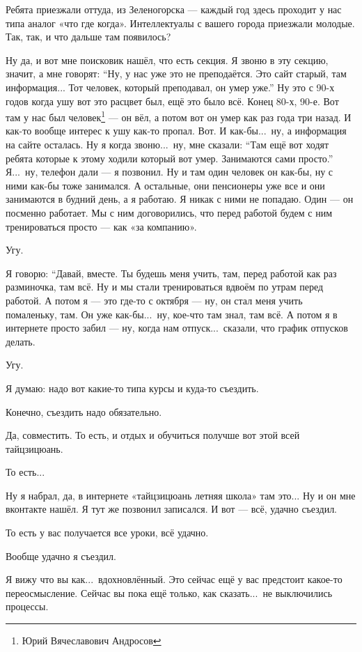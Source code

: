 \A
Ребята приезжали оттуда, из Зеленогорска --- каждый год здесь проходит у нас
типа аналог «что где когда». Интеллектуалы с вашего города приезжали молодые.
Так, так, и что дальше там появилось?

\I
Ну да, и вот мне поисковик нашёл, что есть секция. Я звоню в эту секцию, значит, а мне говорят:
``Ну, у нас уже это не преподаётся. Это сайт старый, там информация...
Тот человек, который преподавал, он умер уже.''
Ну это с 90-х годов когда ушу вот это расцвет был, ещё это было всё.
Конец 80-х, 90-е. Вот там у
нас был человек\footnote{Юрий Вячеславович Андросов} --- он вёл, а потом вот он умер как раз года
три
назад. И как-то вообще интерес к ушу как-то пропал. Вот. И как-бы...\ ну, а информация на сайте
осталась.
Ну я когда звоню...\ ну, мне сказали: ``Там ещё вот ходят ребята которые к этому ходили который
вот умер. Занимаются сами просто.''
Я...\ ну, телефон дали --- я позвонил. Ну и там один человек он как-бы, ну с ними как-бы тоже
занимался. А остальные, они пенсионеры уже все и они занимаются в будний день, а я работаю.
Я никак с ними не попадаю. Один --- он посменно работает. Мы с ним договорились, что перед
работой будем
с ним тренироваться просто --- как «за компанию».

\A
Угу.

\I
Я говорю: ``Давай, вместе. Ты будешь меня учить, там, перед работой как раз разминочка, там всё.
Ну и мы стали тренироваться вдвоём по утрам перед работой.
А потом я --- это где-то с октября --- ну, он стал меня учить помаленьку, там.
Он уже как-бы...\ ну, кое-что там знал, там всё.
А потом я в интернете просто забил --- ну, когда нам отпуск...\ сказали, что график отпусков
делать.

\A
Угу.

\I
Я думаю: надо вот какие-то типа курсы и куда-то съездить.

\A
Конечно, съездить надо обязательно.

\I
Да, совместить. То есть, и отдых и обучиться получше вот этой всей тайцзицюань.

\A
То есть...

\I
Ну я набрал, да, в интернете «тайцзицюань летняя школа» там это...
Ну и он мне вконтакте нашёл. Я тут же позвонил записался. И вот --- всё, удачно съездил.

\A
То есть у вас получается все уроки, всё удачно.

\I
Вообще удачно я съездил.

\A
Я вижу что вы как...\ вдохновлённый.
Это сейчас ещё у вас предстоит какое-то переосмысление.
Сейчас вы пока ещё только, как сказать...\
не выключились процессы.

